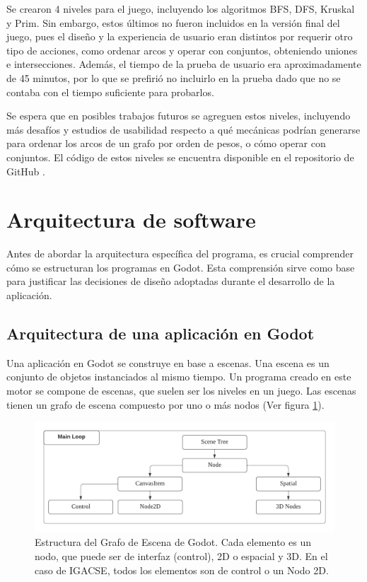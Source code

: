 Se crearon 4 niveles para el juego, incluyendo los algoritmos BFS, DFS, Kruskal y Prim. Sin embargo, estos últimos no fueron incluidos en la versión final del juego, pues el diseño y la experiencia de usuario eran distintos por requerir otro tipo de acciones, como ordenar arcos y operar con conjuntos, obteniendo uniones e intersecciones. Además, el tiempo de la prueba de usuario era aproximadamente de 45 minutos, por lo que se prefirió no incluirlo en la prueba dado que no se contaba con el tiempo suficiente para probarlos.

Se espera que en posibles trabajos futuros se agreguen estos niveles, incluyendo más desafíos y estudios de usabilidad respecto a qué mecánicas podrían generarse para ordenar los arcos de un grafo por orden de pesos, o cómo operar con conjuntos. El código de estos niveles se encuentra disponible en el repositorio de GitHub \cite{GithubRepo}.


\section{Arquitectura de software}

Antes de abordar la arquitectura específica del programa, es crucial comprender cómo se estructuran los programas en Godot. Esta comprensión sirve como base para justificar las decisiones de diseño adoptadas durante el desarrollo de la aplicación.

\subsection{Arquitectura de una aplicación en Godot}

Una aplicación en Godot se construye en base a escenas. Una escena es un conjunto de objetos instanciados al mismo tiempo. Un programa creado en este motor se compone de escenas, que suelen ser los niveles en un juego. Las escenas tienen un grafo de escena compuesto por uno o más nodos (Ver figura \ref{GodotArchitectureDiagram}).

\begin{figure}[h]
	\centering
	\includegraphics[scale=0.8]{Diagramas/GodotArchitectureNodes.png}
	\caption{ Estructura del Grafo de Escena de Godot. Cada elemento es un nodo, que puede ser de interfaz (control), 2D o espacial y 3D. En el caso de IGACSE, todos los elementos son de control o un Nodo 2D.}
	\label{GodotArchitectureDiagram}
\end{figure}

